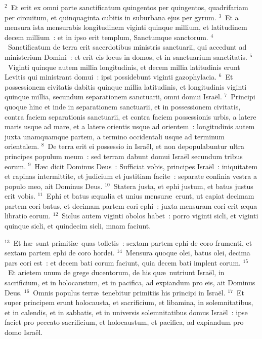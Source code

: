 ${}^{2}$~Et erit ex omni parte sanctificatum quingentos per quingentos, quadrifariam per circuitum, et quinquaginta cubitis in suburbana ejus per gyrum.
${}^{3}$~Et a mensura ista mensurabis longitudinem viginti quinque millium, et latitudinem decem millium~: et in ipso erit templum, Sanctumque sanctorum.
${}^{4}$~Sanctificatum de terra erit sacerdotibus ministris sanctuarii, qui accedunt ad ministerium Domini~: et erit eis locus in domos, et in sanctuarium sanctitatis.
${}^{5}$~Viginti quinque autem millia longitudinis, et decem millia latitudinis erunt Levitis qui ministrant domui~: ipsi possidebunt viginti gazophylacia.
${}^{6}$~Et possessionem civitatis dabitis quinque millia latitudinis, et longitudinis viginti quinque millia, secundum separationem sanctuarii, omni domui Isra\"el.
${}^{7}$~Principi quoque hinc et inde in separationem sanctuarii, et in possessionem civitatis, contra faciem separationis sanctuarii, et contra faciem possessionis urbis, a latere maris usque ad mare, et a latere orientis usque ad orientem~: longitudinis autem juxta unamquamque partem, a termino occidentali usque ad terminum orientalem.
${}^{8}$~De terra erit ei possessio in Isra\"el, et non depopulabuntur ultra principes populum meum~: sed terram dabunt domui Isra\"el secundum tribus eorum.
${}^{9}$~H\ae c dicit Dominus Deus~: Sufficiat vobis, principes Isra\"el~: iniquitatem et rapinas intermittite, et judicium et justitiam facite~: separate confinia vestra a populo meo, ait Dominus Deus.
${}^{10}$~Statera justa, et ephi justum, et batus justus erit vobis.
${}^{11}$~Ephi et batus \ae qualia et unius mensur\ae\ erunt, ut capiat decimam partem cori batus, et decimam partem cori ephi~: juxta mensuram cori erit \ae qua libratio eorum.
${}^{12}$~Siclus autem viginti obolos habet~: porro viginti sicli, et viginti quinque sicli, et quindecim sicli, mnam faciunt.


${}^{13}$~Et h\ae\ sunt primiti\ae\ quas tolletis~: sextam partem ephi de coro frumenti, et sextam partem ephi de coro hordei.
${}^{14}$~Mensura quoque olei, batus olei, decima pars cori est~: et decem bati corum faciunt, quia decem bati implent corum.
${}^{15}$~Et arietem unum de grege ducentorum, de his qu\ae\ nutriunt Isra\"el, in sacrificium, et in holocaustum, et in pacifica, ad expiandum pro eis, ait Dominus Deus.
${}^{16}$~Omnis populus terr\ae\ tenebitur primitiis his principi in Isra\"el.
${}^{17}$~Et super principem erunt holocausta, et sacrificium, et libamina, in solemnitatibus, et in calendis, et in sabbatis, et in universis solemnitatibus domus Isra\"el~: ipse faciet pro peccato sacrificium, et holocaustum, et pacifica, ad expiandum pro domo Isra\"el.



